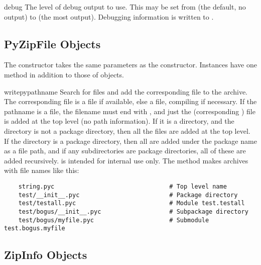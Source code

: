 \begin{memberdesc}{debug}
  The level of debug output to use.  This may be set from 
  (the default, no output) to  (the most output).  Debugging
  information is written to .
\end{memberdesc}


\subsection{PyZipFile Objects \label{pyzipfile-objects}}

The  constructor takes the same parameters as the
 constructor.  Instances have one method in addition to
those of  objects.

\begin{methoddesc}[PyZipFile]{writepy}{pathname}
  Search for files  and add the corresponding file to the
  archive.  The corresponding file is a  file if
  available, else a  file, compiling if necessary.  If the
  pathname is a file, the filename must end with , and just
  the (corresponding ) file is added at the top level
  (no path information).  If it is a directory, and the directory is
  not a package directory, then all the files  are
  added at the top level.  If the directory is a package directory,
  then all  are added under the package name as a file
  path, and if any subdirectories are package directories, all of
  these are added recursively.   is intended for
  internal use only.  The  method makes archives
  with file names like this:

\begin{verbatim}
    string.pyc                                # Top level name 
    test/__init__.pyc                         # Package directory 
    test/testall.pyc                          # Module test.testall
    test/bogus/__init__.pyc                   # Subpackage directory 
    test/bogus/myfile.pyc                     # Submodule test.bogus.myfile
\end{verbatim}
\end{methoddesc}


\subsection{ZipInfo Objects \label{zipinfo-objects}}

